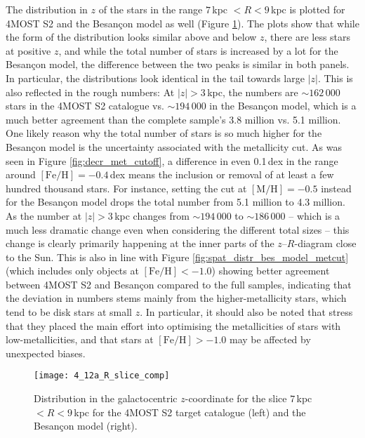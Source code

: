 \documentclass[a4paper,11pt]{article}
\begin{document}
%
The distribution in $z$ of the stars in the range $7$\,kpc $<R<9$\,kpc is plotted for 4MOST S2 and the Besan\c{c}on model as well (Figure \ref{fig:R_slice_comp}). The plots show that while the form of the distribution looks similar above and below $z$, there are less stars at positive $z$, and while the total number of stars is increased by a lot for the Besan\c{c}on model, the difference between the two peaks is similar in both panels. In particular, the distributions look identical in the tail towards large $|z|$. This is also reflected in the rough numbers: At $|z|>3$\,kpc, the numbers are ${\sim}162\,000$ stars in the 4MOST S2 catalogue vs. ${\sim}194\,000$ in the Besan\c{c}on model, which is a much better agreement than the complete sample's 3.8 million vs. 5.1 million. One likely reason why the total number of stars is so much higher for the Besan\c{c}on model is the uncertainty associated with the metallicity cut. As was seen in Figure \ref{fig:decr_met_cutoff}, a difference in even 0.1\,dex in the range around $\mathrm{[Fe/H]}=-0.4$\,dex means the inclusion or removal of at least a few hundred thousand stars. For instance, setting the cut at $\mathrm{[M/H]}=-0.5$ instead for the Besan\c{c}on model drops the total number from 5.1 million to 4.3 million. As the number at $|z|>3$\,kpc changes from ${\sim}194\,000$ to ${\sim}186\,000$ -- which is a much less dramatic change even when considering the different total sizes -- this change is clearly primarily happening at the inner parts of the $z$--$R$-diagram close to the Sun. This is also in line with Figure \ref{fig:spat_distr_bes_model_metcut} (which includes only objects at $\mathrm{[Fe/H]}<-1.0$) showing better agreement between 4MOST S2 and Besan\c{c}on compared to the full samples, indicating that the deviation in numbers stems mainly from the higher-metallicity stars, which tend to be disk stars at small $z$. In particular, it should also be noted that \citet{pristinegaia} stress that they placed the main effort into optimising the metallicities of stars with low-metallicities, and that stars at $\mathrm{[Fe/H]}>-1.0$ may be affected by unexpected biases.
%
\begin{figure}
 \centering
 \texttt{[image: 4\_12a\_R\_slice\_comp]}
 \caption[$z$-distribution for $7$\,kpc $<R<9$\,kpc]{Distribution in the galactocentric $z$-coordinate for the slice $7$\,kpc $<R<9$\,kpc for the 4MOST S2 target catalogue (left) and the Besan\c{c}on model (right).}
 \label{fig:R_slice_comp}
\end{figure}\\ \\
\end{document}

